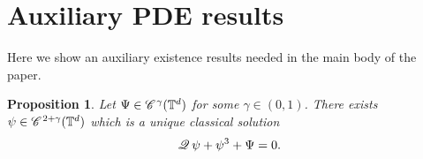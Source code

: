 \documentclass[a4paper,11pt]{article}
\newtheorem{proposition}[theorem]{Proposition}
\numberwithin{equation}{section}
\newcommand{\CC}{\mathscr{C} \hspace{.1em}}
\newcommand{\Q}{\mathscr{Q} \hspace{.2em}}
\newcommand{\8}{\infty}
\begin{document}
\appendix







\section{Auxiliary PDE results}
\label{s:a}

Here we show an auxiliary existence results needed in the main body of the paper.



\begin{proposition}\label{prop:aux-1}
Let $\Psi\in\CC^{\gamma}(\mathbb{T}^{d})$ for some $\gamma\in (0,1)$. There exists $\psi\in \CC^{2+\gamma}(\mathbb{T}^{d})$ which is a unique classical solution
\begin{equation}\label{eq:aux-1}
\Q \psi + \psi^3 + \Psi= 0.
\end{equation}
\end{proposition}
\end{document}
